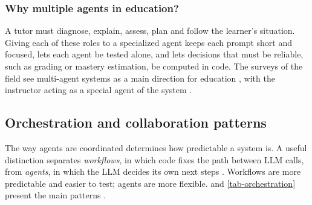 \subsubsection{Why multiple agents in education?}
A tutor must diagnose,
explain, assess, plan and follow the learner's situation. Giving each of
these roles to a specialized agent keeps each prompt short and focused,
lets each agent be tested alone, and lets decisions that must be reliable,
such as grading or mastery estimation, be computed in code. The surveys of
the field see multi-agent systems as a main direction for education
\cite{chu2025agents}, with the instructor acting as a special agent of the
system \cite{wang2024llm4edu}.

\subsection{Orchestration and collaboration patterns}
\label{subsec-orchestration}

The way agents are coordinated determines how predictable a system is. A
useful distinction separates \emph{workflows}, in which code fixes the
path between LLM calls, from \emph{agents}, in which the LLM decides its
own next steps \cite{anthropic2024agents}. Workflows are more predictable
and easier to test; agents are more flexible.  and
\cref{tab-orchestration} present the main patterns
\cite{guo2024mas,anthropic2024agents}.

